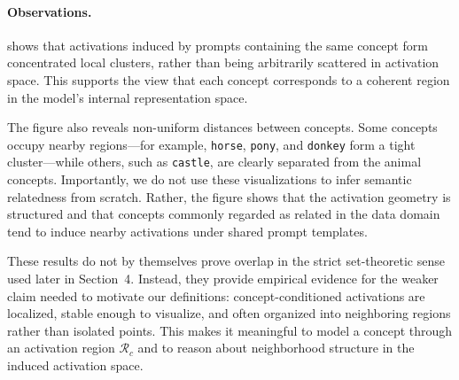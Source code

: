\paragraph{Observations.}
 shows that activations induced by prompts containing the same concept form concentrated local clusters, rather than being arbitrarily scattered in activation space. This supports the view that each concept corresponds to a coherent region in the model's internal representation space.

The figure also reveals non-uniform distances between concepts. Some concepts occupy nearby regions—for example, \texttt{horse}, \texttt{pony}, and \texttt{donkey} form a tight cluster—while others, such as \texttt{castle}, are clearly separated from the animal concepts. Importantly, we do not use these visualizations to infer semantic relatedness from scratch. Rather, the figure shows that the activation geometry is structured and that concepts commonly regarded as related in the data domain tend to induce nearby activations under shared prompt templates.

These results do not by themselves prove overlap in the strict set-theoretic sense used later in Section~4. Instead, they provide empirical evidence for the weaker claim needed to motivate our definitions: concept-conditioned activations are localized, stable enough to visualize, and often organized into neighboring regions rather than isolated points. This makes it meaningful to model a concept through an activation region $\mathcal{R}_c$ and to reason about neighborhood structure in the induced activation space.

